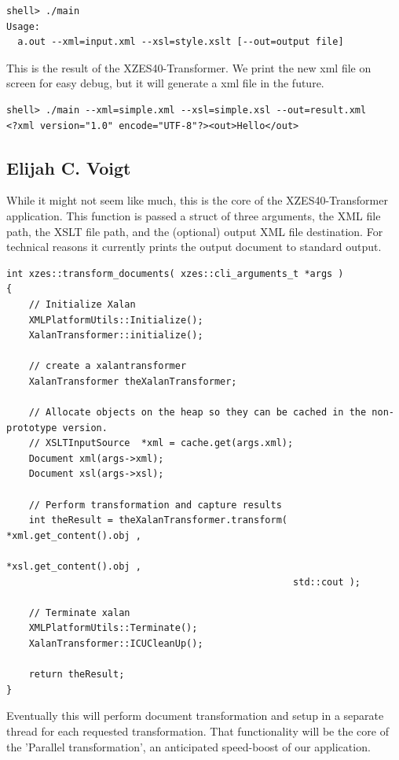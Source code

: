 \begin{lstlisting}
shell> ./main
Usage:
  a.out --xml=input.xml --xsl=style.xslt [--out=output file]
\end{lstlisting}

This is the result of the XZES40-Transformer. We print the new xml file on screen for easy debug, but it will generate a xml file in the future.

\begin{lstlisting}
shell> ./main --xml=simple.xml --xsl=simple.xsl --out=result.xml
<?xml version="1.0" encode="UTF-8"?><out>Hello</out>
\end{lstlisting}

\subsection{Elijah C. Voigt}

While it might not seem like much, this is the core of the XZES40-Transformer application.
This function is passed a struct of three arguments, the XML file path, the XSLT file path, and the (optional) output XML file destination.
For technical reasons it currently prints the output document to standard output.

\begin{lstlisting}
int xzes::transform_documents( xzes::cli_arguments_t *args )
{
    // Initialize Xalan
    XMLPlatformUtils::Initialize();
    XalanTransformer::initialize();

    // create a xalantransformer
    XalanTransformer theXalanTransformer;

    // Allocate objects on the heap so they can be cached in the non-prototype version.
    // XSLTInputSource  *xml = cache.get(args.xml);
    Document xml(args->xml);
    Document xsl(args->xsl);

    // Perform transformation and capture results
    int theResult = theXalanTransformer.transform( *xml.get_content().obj ,
                                                   *xsl.get_content().obj ,
                                                   std::cout );

    // Terminate xalan
    XMLPlatformUtils::Terminate();
    XalanTransformer::ICUCleanUp();

    return theResult;
}
\end{lstlisting}

Eventually this will perform document transformation and setup in a separate thread for each requested transformation.
That functionality will be the core of the 'Parallel transformation', an anticipated speed-boost of our application.

